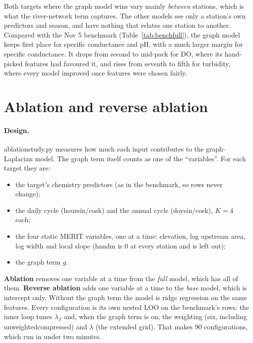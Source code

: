 \documentclass[11pt]{article}
\newcommand{\codeus}{\textunderscore\allowbreak}
\newcommand{\code}[1]{{\ttfamily\let\_\codeus #1}}
\begin{document}
Both targets where the graph model wins vary mainly \emph{between} stations, which is what the
river-network term captures. The other models see only a station's own predictors and season, and
have nothing that relates one station to another. Compared with the Nov 5 benchmark
(Table~\ref{tab:benchfull}), the graph model keeps first place for specific conductance and pH, with
a much larger margin for specific conductance. It drops from second to mid-pack for DO, where its
hand-picked features had favoured it, and rises from seventh to fifth for turbidity, where every model
improved once features were chosen fairly.

\section{Ablation and reverse ablation}
\label{sec:ablation}

\paragraph{Design.} \code{ablation\_study.py} measures how much each input contributes to the
graph-Laplacian model. The graph term itself counts as one of the ``variables''. For each target they
are:
\begin{itemize}
  \item the target's chemistry predictors (as in the benchmark, so rows never change);
  \item the daily cycle (\code{hour\_sin/cos\_k}) and the annual cycle (\code{doy\_sin/cos\_k}),
        $K=4$ each;
  \item the four static MERIT variables, one at a time: elevation, log upstream area, log width and
        local slope (\code{hand\_m} is 0 at every station and is left out);
  \item the graph term $g$.
\end{itemize}
\textbf{Ablation} removes one variable at a time from the \emph{full} model, which has all of them.
\textbf{Reverse ablation} adds one variable at a time to the \emph{base} model, which is intercept
only. Without the graph term the model is ridge regression on the same features. Every configuration
is its own nested LOO on the benchmark's rows: the inner loop tunes $\lambda_\beta$ and, when the
graph term is on, the weighting (six, including \code{unweighted\_compressed}) and $\lambda$ (the
extended grid). That makes 90 configurations, which run in under two minutes.
\end{document}
